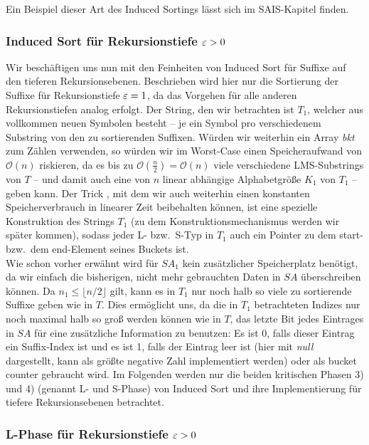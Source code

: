 Ein Beispiel dieser Art des Induced Sortings lässt sich im SAIS-Kapitel  finden.

\subsubsection{ Induced Sort für Rekursionstiefe $\varepsilon > 0$}

Wir beschäftigen uns nun mit den Feinheiten von Induced Sort für Suffixe auf den tieferen Rekursionsebenen. Beschrieben wird hier nur die Sortierung der Suffixe für Rekursionstiefe $\varepsilon = 1$, da das Vorgehen für alle anderen Rekursionstiefen analog erfolgt. Der String, den wir betrachten ist $T_1$, welcher aus vollkommen neuen Symbolen besteht -- je ein Symbol pro verschiedenem Substring von den zu sortierenden Suffixen. Würden wir weiterhin ein Array \textit{bkt} zum Zählen verwenden, so würden wir im Worst-Case einen Speicheraufwand von $\mathcal O(n)$ riskieren, da es bis zu $\mathcal O(\frac{n}{2}) = \mathcal O(n)$ viele verschiedene LMS-Substrings von $T$ -- und damit auch eine von $n$ linear abhängige Alphabetgröße $K_1$ von $T_1$ -- geben kann. Der Trick , mit dem wir auch weiterhin einen konstanten Speicherverbrauch in linearer Zeit beibehalten können, ist eine spezielle Konstruktion des Strings $T_1$ (zu dem Konstruktionsmechanismus werden wir später kommen), sodass jeder L- bzw.\ S-Typ in $T_1$ auch ein Pointer zu dem start- bzw.\ dem end-Element seines Buckets ist.  \\
Wie schon vorher erwähnt wird für $SA_1$ kein zusätzlicher Speicherplatz benötigt, da wir einfach  die bisherigen, nicht mehr gebrauchten Daten in $SA$ überschreiben können. Da $n_1  \leq \lfloor n/2 \rfloor$ gilt, kann es in $T_1$ nur noch halb so viele zu sortierende Suffixe geben wie in $T$. Dies ermöglicht uns, da die in $T_1$ betrachteten Indizes nur noch maximal halb so groß werden können wie in $T$, das letzte Bit jedes Eintrages in $SA$ für eine zusätzliche Information zu benutzen: Es ist 0, falls dieser Eintrag ein Suffix-Index ist und es ist 1, falls der Eintrag leer ist (hier mit \textit{null} dargestellt, kann als größte negative Zahl implementiert werden) oder als bucket counter gebraucht wird. Im Folgenden werden nur die beiden kritischen Phasen 3) und 4) (genannt L- und S-Phase) von Induced Sort und ihre Implementierung für tiefere Rekursionsebenen betrachtet.

\subsubsection{ L-Phase für Rekursionstiefe $\varepsilon > 0$}


